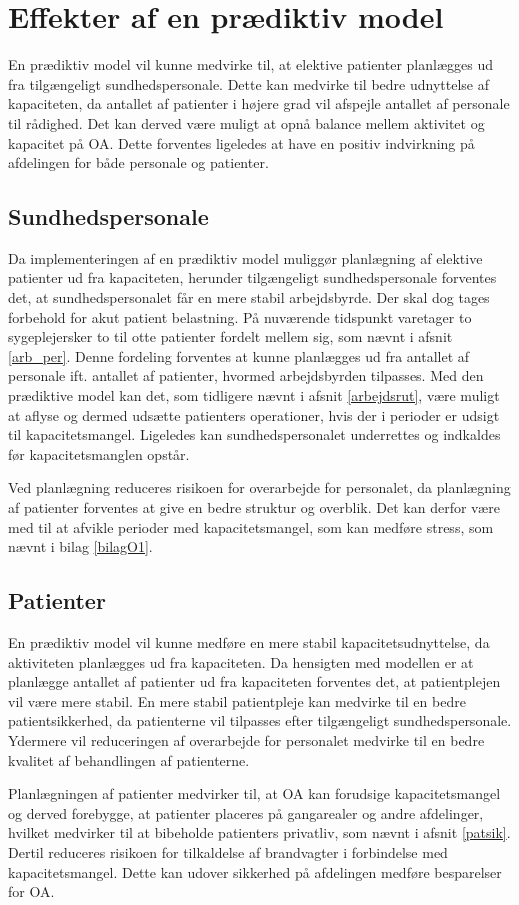 \section{Effekter af en prædiktiv model}
En prædiktiv model vil kunne medvirke til, at elektive patienter planlægges ud fra tilgængeligt sundhedspersonale. Dette kan medvirke til bedre udnyttelse af kapaciteten, da antallet af patienter i højere grad vil afspejle antallet af personale til rådighed. Det kan derved være muligt at opnå balance mellem aktivitet og kapacitet på OA. Dette forventes ligeledes at have en positiv indvirkning på afdelingen for både personale og patienter. 


\subsection{Sundhedspersonale} \label{sundper}
Da implementeringen af en prædiktiv model muliggør planlægning af elektive patienter ud fra kapaciteten, herunder tilgængeligt sundhedspersonale forventes det, at sundhedspersonalet får en mere stabil arbejdsbyrde. Der skal dog tages forbehold for akut patient belastning. På nuværende tidspunkt varetager to sygeplejersker to til otte patienter fordelt mellem sig, som nævnt i afsnit \ref{arb_per}. Denne fordeling forventes at kunne planlægges ud fra antallet af personale ift. antallet af patienter, hvormed arbejdsbyrden tilpasses. Med den prædiktive model kan det, som tidligere nævnt i afsnit \ref{arbejdsrut}, være muligt at aflyse og dermed udsætte patienters operationer, hvis der i perioder er udsigt til kapacitetsmangel. Ligeledes kan sundhedspersonalet underrettes og indkaldes før kapacitetsmanglen opstår.


Ved planlægning reduceres risikoen for overarbejde for personalet, da planlægning af patienter forventes at give en bedre struktur og overblik. Det kan derfor være med til at afvikle perioder med kapacitetsmangel, som kan medføre stress, som nævnt i bilag \ref{bilagO1}.




\subsection{Patienter}
En prædiktiv model vil kunne medføre en mere stabil kapacitetsudnyttelse, da aktiviteten planlægges ud fra kapaciteten. Da hensigten med modellen er at planlægge antallet af patienter ud fra kapaciteten forventes det, at patientplejen vil være mere stabil. En mere stabil patientpleje kan medvirke til en bedre patientsikkerhed, da patienterne vil tilpasses efter tilgængeligt sundhedspersonale. Ydermere vil reduceringen af overarbejde for personalet medvirke til en bedre kvalitet af behandlingen af patienterne. 


Planlægningen af patienter medvirker til, at OA kan forudsige kapacitetsmangel og derved forebygge, at patienter placeres på gangarealer og andre afdelinger, hvilket medvirker til at bibeholde patienters privatliv, som nævnt i afsnit \ref{patsik}. Dertil reduceres risikoen for tilkaldelse af brandvagter i forbindelse med kapacitetsmangel. Dette kan udover sikkerhed på afdelingen medføre besparelser for OA. 

